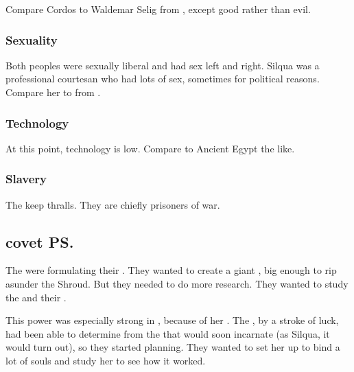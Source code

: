 Compare Cordos to Waldemar Selig from \cite{JacquelineCarey:KushielsDart}, except good rather than evil. 






\subsubsection{Sexuality}
Both peoples were sexually liberal and had sex left and right. 
Silqua was a professional courtesan who had lots of sex, sometimes for political reasons. 
Compare her to \PhedreNoDelaunay{} from \cite{JacquelineCarey:KushielsLegacy}. 









\subsubsection{Technology}
At this point, technology is low. 
Compare to Ancient Egypt the like. 





\subsubsection{Slavery}
The \Imrathi keep thralls. 
They are chiefly prisoners of war. 







\subsection{\Banelords{} covet \ps{\Eryal} \carcer}
The \banelords{} were formulating their . 
They wanted to create a giant , big enough to rip asunder the Shroud. 
But they needed to do more research. 
They wanted to study the \malachim{} and their . 

This power was especially strong in , because of her . 
The \banelords{}, by a stroke of luck, had been able to determine from the \matrices{} that \Eryal{} would soon incarnate (as Silqua, it would turn out), so they started planning. 
They wanted to set her up to bind a lot of souls and study her to see how it worked. 


